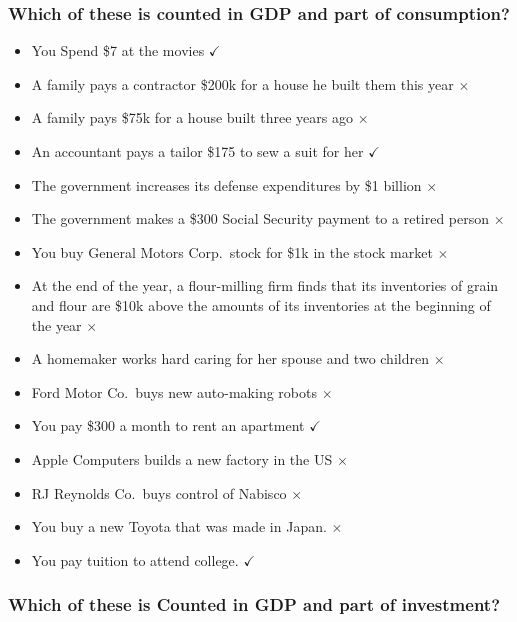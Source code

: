 \documentclass[
  letterpaper,
  DIV=11,
  numbers=noendperiod]{scrartcl}
\providecommand{\tightlist}{%
  \setlength{\itemsep}{0pt}\setlength{\parskip}{0pt}}\usepackage{longtable,booktabs,array}
\begin{document}
\subsubsection{Which of these is counted in GDP and part of
consumption?}\label{which-of-these-is-counted-in-gdp-and-part-of-consumption}

\begin{itemize}
\tightlist
\item
  You Spend \$7 at the movies \(\checkmark\)
\item
  A family pays a contractor \$200k for a house he built them this year
  \(\times\)
\item
  A family pays \$75k for a house built three years ago \(\times\)
\item
  An accountant pays a tailor \$175 to sew a suit for her \(\checkmark\)
\item
  The government increases its defense expenditures by \$1 billion
  \(\times\)
\item
  The government makes a \$300 Social Security payment to a retired
  person \(\times\)
\item
  You buy General Motors Corp.~stock for \$1k in the stock market
  \(\times\)
\item
  At the end of the year, a flour-milling firm finds that its
  inventories of grain and flour are \$10k above the amounts of its
  inventories at the beginning of the year \(\times\)
\item
  A homemaker works hard caring for her spouse and two children
  \(\times\)
\item
  Ford Motor Co.~buys new auto-making robots \(\times\)
\item
  You pay \$300 a month to rent an apartment \(\checkmark\)
\item
  Apple Computers builds a new factory in the US \(\times\)
\item
  RJ Reynolds Co.~buys control of Nabisco \(\times\)
\item
  You buy a new Toyota that was made in Japan. \(\times\)
\item
  You pay tuition to attend college. \(\checkmark\)
\end{itemize}

\subsubsection{Which of these is Counted in GDP and part of
investment?}\label{which-of-these-is-counted-in-gdp-and-part-of-investment}
\end{document}
